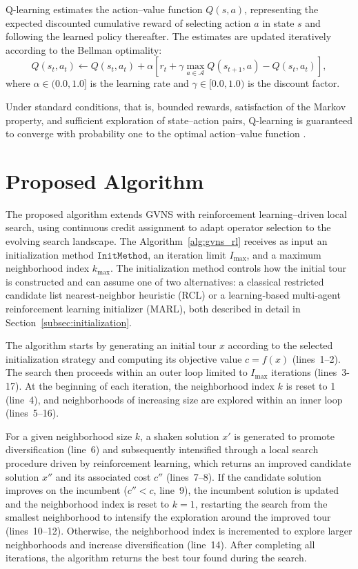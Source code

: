 \documentclass[runningheads]{llncs}
\begin{document}
Q-learning estimates the action--value function $Q(s,a)$, representing the expected discounted cumulative reward of selecting action $a$ in state $s$ and following the learned policy thereafter. The estimates are updated iteratively according to the Bellman optimality:
\begin{equation}
\label{eq:bellman}
Q(s_t,a_t) \leftarrow Q(s_t,a_t) +
\alpha \left[
r_t + \gamma \max_{a \in \mathcal{A}} Q(s_{t+1}, a) - Q(s_t,a_t)
\right],
\end{equation}
where $\alpha \in (0.0,1.0]$ is the learning rate and $\gamma \in [0.0,1.0)$ is the discount factor.

Under standard conditions, that is, bounded rewards, satisfaction of the Markov property, and sufficient exploration of state--action pairs, Q-learning is guaranteed to converge with probability one to the optimal action--value function \cite{sutton1998reinforcement,watkins1989learning}.


\section{Proposed Algorithm}
\label{sec:3}
The proposed algorithm extends GVNS with reinforcement learning–driven local search, using continuous credit assignment to adapt operator selection to the evolving search landscape. The Algorithm~\ref{alg:gvns_rl} receives as input an initialization method $\texttt{InitMethod}$, an iteration limit $I_{\max}$, and a maximum neighborhood index $k_{\max}$. The initialization method controls how the initial tour is constructed and can assume one of two alternatives: a classical restricted candidate list nearest‑neighbor heuristic (\textsc{RCL}) or a learning‑based multi‑agent reinforcement learning initializer (\textsc{MARL}), both described in detail in Section~\ref{subsec:initialization}.

The algorithm starts by generating an initial tour $x$ according to the selected initialization strategy and computing its objective value $c = f(x)$ (lines~1--2). The search then proceeds within an outer loop limited to $I_{\max}$ iterations (lines~3-17). At the beginning of each iteration, the neighborhood index $k$ is reset to 1 (line~4), and neighborhoods of increasing size are explored within an inner loop (lines~5--16).

For a given neighborhood size $k$, a shaken solution $x'$ is generated to promote diversification (line~6) and subsequently intensified through a local search procedure driven by reinforcement learning, which returns an improved candidate solution $x''$ and its associated cost $c''$ (lines~7--8). If the candidate solution improves on the incumbent ($c'' < c$, line~9), the incumbent solution is updated and the neighborhood index is reset to $k = 1$, restarting the search from the smallest neighborhood to intensify the exploration around the improved tour (lines~10--12). Otherwise, the neighborhood index is incremented to explore larger neighborhoods and increase diversification (line~14). After completing all iterations, the algorithm returns the best tour found during the search.
\end{document}
